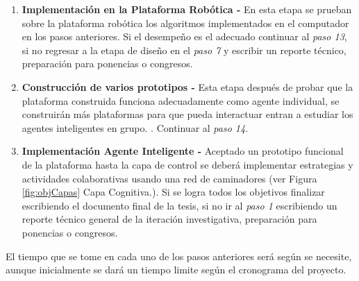 \documentclass[12pt,twoside,onecolumn,letterpaper]{article}
\begin{document}
\begin{enumerate}
\item \textbf{Implementación en la Plataforma Rob\'otica - } En esta etapa se prueban sobre la plataforma rob\'otica los algoritmos implementados en el computador en los pasos anteriores. Si el desempe\~no es el adecuado continuar al \emph{paso 13}, si no regresar a la etapa de dise\~no en el \emph{paso 7} y escribir un reporte t\'ecnico, preparaci\'on para ponencias o congresos.\par
\item \textbf{Construcción de varios prototipos - } Esta etapa despu\'es de probar que la plataforma construida funciona adecuadamente como agente individual, se construir\'an m\'as plataformas para que pueda interactuar entran a estudiar los agentes inteligentes en grupo. . Continuar al \emph{paso 14}.\par
\item \textbf{Implementaci\'on Agente Inteligente - } Aceptado un prototipo funcional de la plataforma hasta la capa de control se deberá  implementar estrategias y actividades colaborativas usando una red de caminadores  (ver Figura \ref{fig:objCapas} Capa Cognitiva.). Si se logra todos los objetivos finalizar escribiendo el documento final de la tesis, si no ir al \emph{paso 1} escribiendo un reporte t\'ecnico general de la iteraci\'on investigativa, preparaci\'on para ponencias o congresos.\par
\end{enumerate}
El tiempo que se tome en cada uno de los pasos anteriores ser\'a seg\'un se necesite, aunque inicialmente se dar\'a un tiempo limite seg\'un el cronograma del proyecto.\par
\end{document}
